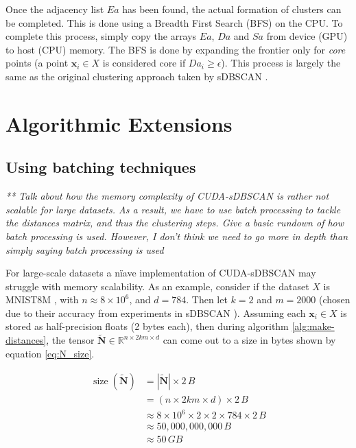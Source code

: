 \documentclass{article}
\newcommand{\bxi}{\mathbf{x}_{i}}
\newcommand{\eps}{\epsilon}
\newcommand{\bNt}{\widetilde{\mathbf{N}}}
\newcommand{\Real}{\mathbb{R}}
\newcommand{\Da}{\textit{Da}}
\newcommand{\Sa}{\textit{Sa}}
\newcommand{\Ea}{\textit{Ea}}
\begin{document}
Once the adjacency list $\Ea$ has been found, the actual formation of clusters can be completed. This is done using a Breadth First Search (BFS) \cite{jason199} on the CPU. To complete this process, simply copy the arrays $\Ea$, $\Da$ and $\Sa$ from device (GPU) to host (CPU) memory. The BFS is done by expanding the frontier only for \textit{core} points (a point $\bxi \in X$ is considered core if $\Da_i \geq \eps$). This process is largely the same as the original clustering approach taken by sDBSCAN \cite{S_DBSCAN}.

\section{Algorithmic Extensions}

\subsection{Using batching techniques}

\textit{** Talk about how the memory complexity of CUDA-sDBSCAN is rather not scalable for large datasets. As a result, we have to use batch processing to tackle the distances matrix, and thus the clustering steps. Give a basic rundown of how batch processing is used. However, I don't think we need to go more in depth than simply saying batch processing is used}

For large-scale datasets a nïave implementation of CUDA-sDBSCAN may struggle with memory scalability. As an example, consider if the dataset $X$ is MNIST8M \cite{bottou_infimnist}, with $n \approx 8 \times 10^6$, and $d = 784$. Then let $k=2$ and $m=2000$ (chosen due to their accuracy from experiments in sDBSCAN \cite{S_DBSCAN}). Assuming each $\bxi \in X$ is stored as half-precision floats (2 bytes each), then during algorithm \ref{alg:make-distances}, the tensor $\bNt \in \Real^{n \times 2km \times d}$ can come out to a size in bytes shown by equation \ref{eq:N_size}.

\begin{equation}
    \label{eq:N_size} %
    \begin{aligned}
        \operatorname{size}(\bNt) &= |\bNt| \times 2\,B \\
        &= (n \times 2km \times d) \times 2\,B \\
        &\approx 8 \times 10^6 \times 2 \times 2 \times 784 \times 2\,B \\
        &\approx 50,000,000,000\,B \\
        &\approx 50\,GB
    \end{aligned}
\end{equation}
\end{document}
